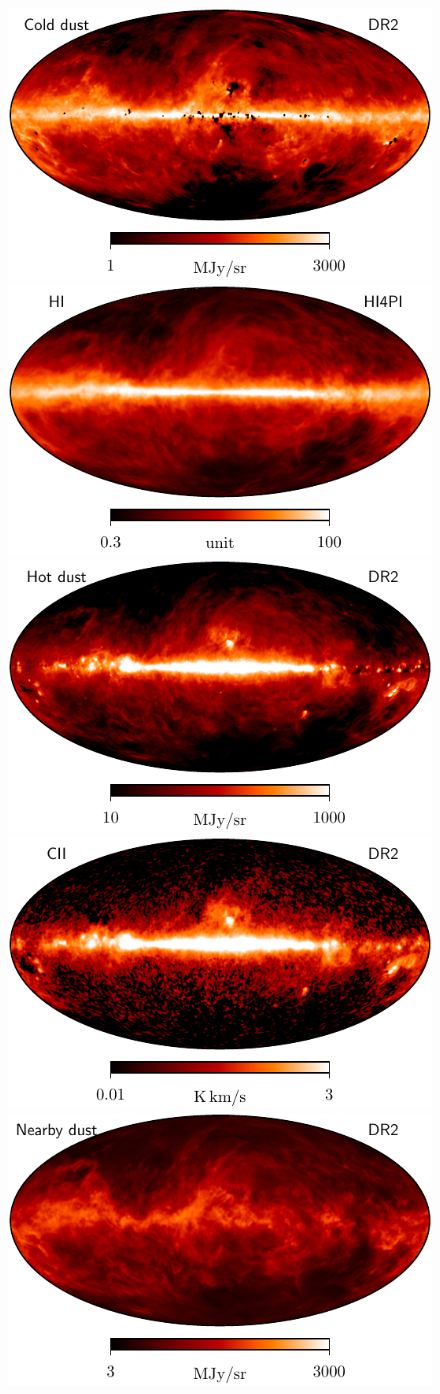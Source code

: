 \documentclass{aa}
\begin{document}
\begin{figure}
  \centering
  \includegraphics[width=0.49\linewidth]{figures/CGDR2_colddust_1deg_n512_v1.pdf}
  \includegraphics[width=0.49\linewidth]{figures/HI4PI_NHI_n0064_60arcmin_rescaled_TQU.pdf}\\
  \includegraphics[width=0.49\linewidth]{figures/CGDR2_hotdust_1deg_n512_v1.pdf}
  \includegraphics[width=0.49\linewidth]{figures/CGDR2_CII_1deg_n512_v1.pdf}\\
  \includegraphics[width=0.49\linewidth]{figures/CGDR2_neardust_1deg_n512_v1.pdf}

\end{figure}
\end{document}
